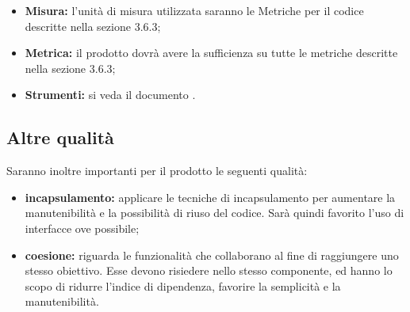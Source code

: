 		\begin{itemize}
			\item \textbf{Misura: }l’unità di misura utilizzata saranno le Metriche per il codice descritte nella sezione 3.6.3;
			\item \textbf{Metrica: }il prodotto dovrà avere la sufficienza su tutte le metriche descritte nella sezione 3.6.3;
			\item \textbf{Strumenti: }si veda il documento \NdP.
			
		\end{itemize}
	
	\subsection{Altre qualità}
		Saranno inoltre importanti per il prodotto le seguenti qualità:
		
		\begin{itemize}
			\item \textbf{incapsulamento: }applicare le tecniche di incapsulamento per aumentare la manutenibilità
			e la possibilità di riuso del codice. Sarà quindi favorito l’uso di interfacce ove
			possibile;
			\item \textbf{coesione: }riguarda le funzionalità che collaborano al fine di raggiungere uno stesso obiettivo. Esse devono risiedere nello stesso componente, ed hanno lo scopo di ridurre l’indice di dipendenza, favorire la semplicità e la manutenibilità.
			
		\end{itemize}
		
	
	
	
